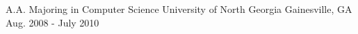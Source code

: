 


\begin{cventries}


\cventry
{A.A. Majoring in Computer Science} %
{University of North Georgia} %
{Gainesville, GA} %
{Aug. 2008 - July 2010} %
{ %
\begin{cvitems}
\end{cvitems}
}


\end{cventries}